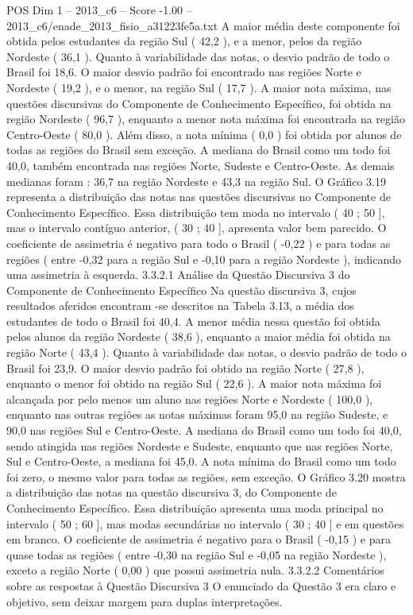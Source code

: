 \begin{textsample}{POS Dim 1 – 2013\_c6 – Score -1.00 – 2013\_c6/enade\_2013\_fisio\_a31223fe5a.txt}
A maior média deste componente foi obtida pelos estudantes da região Sul ( 42,2 ), e a menor, pelos da região Nordeste ( 36,1 ).
Quanto à variabilidade das notas, o desvio padrão de todo o Brasil foi 18,6.
O maior desvio padrão foi encontrado nas regiões Norte e Nordeste ( 19,2 ), e o menor, na região Sul ( 17,7 ).
A maior nota máxima, nas questões discursivas do Componente de Conhecimento Específico, foi obtida na região Nordeste ( 96,7 ), enquanto a menor nota máxima foi encontrada na região Centro-Oeste ( 80,0 ).
Além disso, a nota mínima ( 0,0 ) foi obtida por alunos de todas as regiões do Brasil sem exceção.
A mediana do Brasil como um todo foi 40,0, também encontrada nas regiões Norte, Sudeste e Centro-Oeste.
As demais medianas foram : 36,7 na região Nordeste e 43,3 na região Sul.
O Gráfico 3.19 representa a distribuição das notas nas questões discursivas no Componente de Conhecimento Específico.
Essa distribuição tem moda no intervalo ( 40 ; 50 ], mas o intervalo contíguo anterior, ( 30 ; 40 ], apresenta valor bem parecido.
O coeficiente de assimetria é negativo para todo o Brasil ( -0,22 ) e para todas as regiões ( entre -0,32 para a região Sul e -0,10 para a região Nordeste ), indicando uma assimetria à esquerda. 3.3.2.1 Análise da Questão Discursiva 3 do Componente de Conhecimento Específico Na questão discursiva 3, cujos resultados aferidos encontram -se descritos na Tabela 3.13, a média dos estudantes de todo o Brasil foi 40,4.
A menor média nessa questão foi obtida pelos alunos da região Nordeste ( 38,6 ), enquanto a maior média foi obtida na região Norte ( 43,4 ).
Quanto à variabilidade das notas, o desvio padrão de todo o Brasil foi 23,9.
O maior desvio padrão foi obtido na região Norte ( 27,8 ), enquanto o menor foi obtido na região Sul ( 22,6 ).
A maior nota máxima foi alcançada por pelo menos um aluno nas regiões Norte e Nordeste ( 100,0 ), enquanto nas outras regiões as notas máximas foram 95,0 na região Sudeste, e 90,0 nas regiões Sul e Centro-Oeste.
A mediana do Brasil como um todo foi 40,0, sendo atingida nas regiões Nordeste e Sudeste, enquanto que nas regiões Norte, Sul e Centro-Oeste, a mediana foi 45,0.
A nota mínima do Brasil como um todo foi zero, o mesmo valor para todas as regiões, sem exceção.
O Gráfico 3.20 mostra a distribuição das notas na questão discursiva 3, do Componente de Conhecimento Específico.
Essa distribuição apresenta uma moda principal no intervalo ( 50 ; 60 ], mas modas secundárias no intervalo ( 30 ; 40 ] e em questões em branco.
O coeficiente de assimetria é negativo para o Brasil ( -0,15 ) e para quase todas as regiões ( entre -0,30 na região Sul e -0,05 na região Nordeste ), exceto a região Norte ( 0,00 ) que possui assimetria nula. 3.3.2.2 Comentários sobre as respostas à Questão Discursiva 3 O enunciado da Questão 3 era claro e objetivo, sem deixar margem para duplas interpretações.

\end{textsample}
